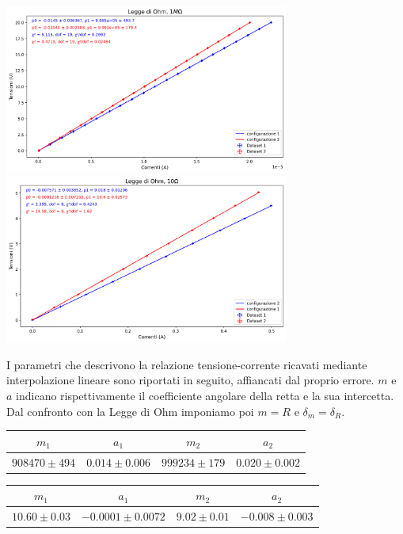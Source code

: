 \documentclass[a4paper]{article}
\begin{document}
\begin{center}
\includegraphics[width=0.7\textwidth]{grafici/ohm_resistenza_alta.png}
\includegraphics[width=0.7\textwidth]{grafici/ohm_resistenza_bassa.png}
\end{center}

I parametri che descrivono la relazione tensione-corrente ricavati mediante interpolazione lineare sono riportati in seguito, affiancati dal proprio errore. \( \mathit{m} \) e \( \mathit{a} \) indicano rispettivamente il coefficiente angolare della retta e la sua intercetta. Dal confronto con la Legge di Ohm imponiamo poi \( m = R \) e \( \delta_{m} = \delta_{R} \).

\begin{center}
\begin{tabular}{|c|c|c|c|}
\hline
$m_1$ & $a_1$ & $m_2$ & $a_2$ \\
\hline
$908470 \pm 494$ & $0.014 \pm 0.006$ & $999234 \pm 179$ & $0.020 \pm 0.002$\\
\hline
\end{tabular}
\end{center}
\begin{center}
\begin{tabular}{|c|c|c|c|}
\hline
$m_1$ & $a_1$ & $m_2$ & $a_2$ \\
\hline
$10.60 \pm 0.03$ & $-0.0001 \pm 0.0072$ & $9.02 \pm 0.01$ & $-0.008 \pm 0.003$\\
\hline
\end{tabular}
\end{center}
\end{document}

